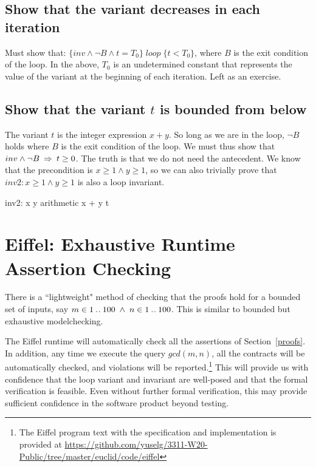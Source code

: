 \documentclass[runningheads,12pt]{article}
\begin{document}
\subsection{Show that the variant decreases in each iteration}

Must show that: $\{inv \land \lnot B \land t = T_0\}\; loop \;\{t < T_0\}$, where $B$ is the exit condition of the loop. In the above, $T_0$ is an undetermined constant that represents the value of the variant at the beginning of each iteration. Left as an exercise.

\subsection{Show that the variant $t$ is bounded from below}

The variant $t$ is the integer expression $x+y$. So long as we are in the loop, $\lnot B$ holds where $B$ is the exit condition of the loop. We must thus show that $inv \land \lnot B \; \mathbin\Rightarrow \; t \geq 0$. The truth is that we do not need the antecedent. We know that the precondition is $x \geq 1 \land y \geq 1$, so we can also trivially prove that $inv2: x \geq 1 \land y \geq 1$ is also a loop invariant. 

\begin{calculation}
	inv2: x  \land y 
\hint{\limp} {arithmetic}
	x + y 
	t  \qquad\blacksquare
\end{calculation}

\section{Eiffel: Exhaustive Runtime Assertion Checking}
There is a ``lightweight" method of checking that the proofs hold for a bounded set of inputs, say $m \in 1\mathbin{.\mkern1mu.} 100 \; \land \; n \in 1\mathbin{.\mkern1mu.} 100$. This is similar to bounded but exhaustive modelchecking. 

The Eiffel runtime will automatically check all the assertions of Section~\ref{proofs}. In addition, any time we execute the query $gcd(m,n)$, all the contracts will be automatically checked, and violations will be reported.\footnote{%
The Eiffel program text with the specification and  implementation is provided at \url{https://github.com/yuselg/3311-W20-Public/tree/master/euclid/code/eiffel}}
This will provide us with confidence that the loop variant and invariant are well-posed and that the formal verification is feasible. Even without further formal verification, this may provide sufficient confidence in the software product beyond testing. 
\end{document}
